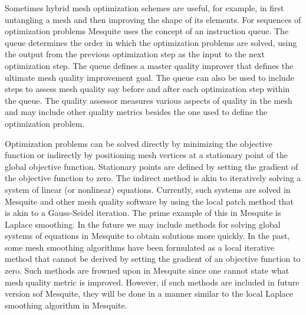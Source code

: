 Sometimes hybrid mesh optimization schemes are useful, for example, in 
first untangling a mesh and then improving the shape of its elements. For 
sequences of optimization problems Mesquite uses the concept of an 
instruction queue.  The queue determines the order in which the optimization
problems are solved, using the output from the previous optimization step 
as the input to the next optimization step. The queue defines a master 
quality improver that defines the ultimate mesh quality improvement goal.
The queue can also be used to include steps to assess mesh quality say 
before and after each optimization step within the queue.  The quality 
assessor measures various aspects of quality in the mesh and may include 
other quality metrics besides the one used to define the optimization problem.
\newline

Optimization problems can be solved directly by minimizing the objective 
function or indirectly by positioning mesh vertices at a stationary point
of the global objective function. Stationary points are defined by setting 
the gradient of the objective function to zero. The indirect method is akin 
to iteratively solving a system of linear (or nonlinear) equations. 
Currently, such systems are solved in Mesquite and other mesh quality 
software by using the local patch method that is akin 
to a Gauss-Seidel iteration. The prime example of this in Mesquite is 
Laplace smoothing. In the 
future we may include methods for solving global systems of equations 
in Mesquite to obtain solutions more quickly. 
In the past, some mesh smoothing algorithms have been formulated as a 
local iterative method that cannot be derived  
by setting the gradient of an objective function to zero. Such methods are
frowned upon in Mesquite since one cannot state what mesh quality metric is
improved.  However, if such methods are included in future version sof Mesquite, they will be done in a manner similar to the local Laplace smoothing 
algorithm in Mesquite. \newline

